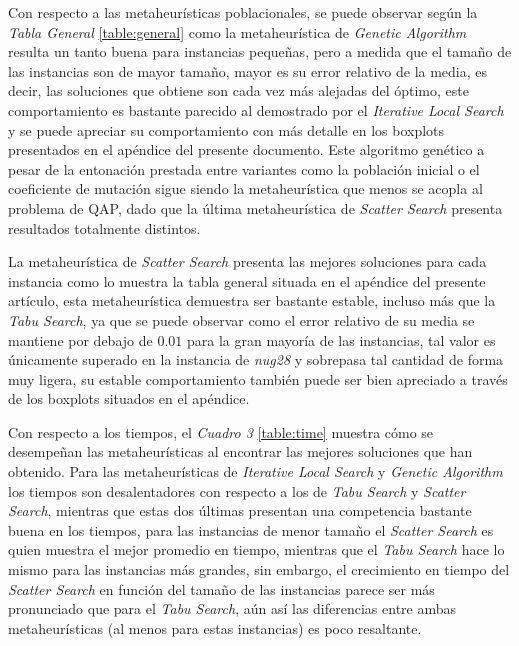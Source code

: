 \documentclass{ci5652}
\begin{document}
Con respecto a las metaheurísticas poblacionales, se puede observar según la \textit{Tabla General} \ref{table:general} como la metaheurística de \textit{Genetic Algorithm} resulta un tanto buena para instancias pequeñas, pero a medida que el tamaño de las instancias son de mayor tamaño, mayor es su error relativo de la media, es decir, las soluciones que obtiene son cada vez más alejadas del óptimo, este comportamiento es bastante parecido al demostrado por el \textit{Iterative Local Search} y se puede apreciar su comportamiento con más detalle en los boxplots presentados en el apéndice del presente documento. Este algoritmo genético a pesar de la entonación prestada entre variantes como la población inicial o el coeficiente de mutación sigue siendo la metaheurística que menos se acopla al problema de QAP, dado que la última metaheurística de \textit{Scatter Search} presenta resultados totalmente distintos.

La metaheurística de \textit{Scatter Search} presenta las mejores soluciones para cada instancia como lo muestra la tabla general situada en el apéndice del presente artículo, esta metaheurística demuestra ser bastante estable, incluso más que la \textit{Tabu Search}, ya que se puede observar como el error relativo de su media se mantiene por debajo de \(0.01\) para la gran mayoría de las instancias, tal valor es únicamente superado en la instancia de \textit{nug28} y sobrepasa tal cantidad de forma muy ligera, su estable comportamiento también puede ser bien apreciado a través de los boxplots situados en el apéndice.

Con respecto a los tiempos, el \textit{Cuadro 3} \ref{table:time} muestra cómo se desempeñan las metaheurísticas al encontrar las mejores soluciones que han obtenido. Para las metaheurísticas de \textit{Iterative Local Search} y \textit{Genetic Algorithm} los tiempos son desalentadores con respecto a los de \textit{Tabu Search} y \textit{Scatter Search}, mientras que estas dos últimas presentan una competencia bastante buena en los tiempos, para las instancias de menor tamaño el \textit{Scatter Search} es quien muestra el mejor promedio en tiempo, mientras que el \textit{Tabu Search} hace lo mismo para las instancias más grandes, sin embargo, el crecimiento en tiempo del \textit{Scatter Search} en función del tamaño de las instancias parece ser más pronunciado que para el \textit{Tabu Search}, aún así las diferencias entre ambas metaheurísticas (al menos para estas instancias) es poco resaltante.
\end{document}
